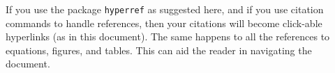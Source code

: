 \documentclass{scspaperproc}
\theoremstyle{scsthe}
\begin{document}
If you use the package \texttt{hyperref} as suggested here, and if you use citation commands to handle references, then your citations will
become click-able hyperlinks (as in this document). The same happens to all the references to equations, figures, and tables. This can aid the reader in navigating the document.


%
%
%
%
%
\end{document}
